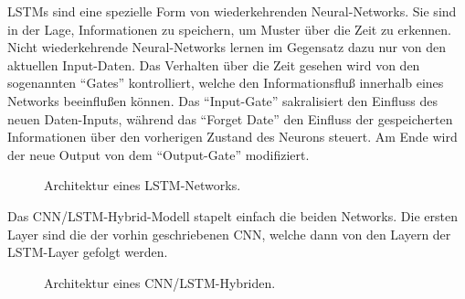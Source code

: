 LSTMs\cite{hochreiter97} sind eine spezielle Form von wiederkehrenden Neural-Networks.
Sie sind in der Lage, Informationen zu speichern, um Muster über die Zeit zu erkennen. 
Nicht wiederkehrende Neural-Networks lernen im Gegensatz dazu nur von den aktuellen Input-Daten.
Das Verhalten über die Zeit gesehen wird von den sogenannten ``Gates'' kontrolliert, welche den Informationsfluß innerhalb eines Networks beeinflußen können.
Das ``Input-Gate'' sakralisiert den Einfluss des neuen Daten-Inputs, während das ``Forget Date'' den Einfluss der gespeicherten Informationen über den vorherigen Zustand des Neurons steuert.
Am Ende wird der neue Output von dem ``Output-Gate'' modifiziert. \\


\begin{figure}[H]
\caption{Architektur eines LSTM-Networks. }
\label{fig:lstm} \end{figure} \vspace{0.5cm}


Das CNN/LSTM-Hybrid-Modell stapelt einfach die beiden Networks.
Die ersten Layer sind die der vorhin geschriebenen CNN, welche dann von den Layern der LSTM-Layer gefolgt werden. \\


\begin{figure}[H]
\caption{Architektur eines CNN/LSTM-Hybriden. }
\label{fig:cnn_lstm} \end{figure} \vspace{0.5cm}














